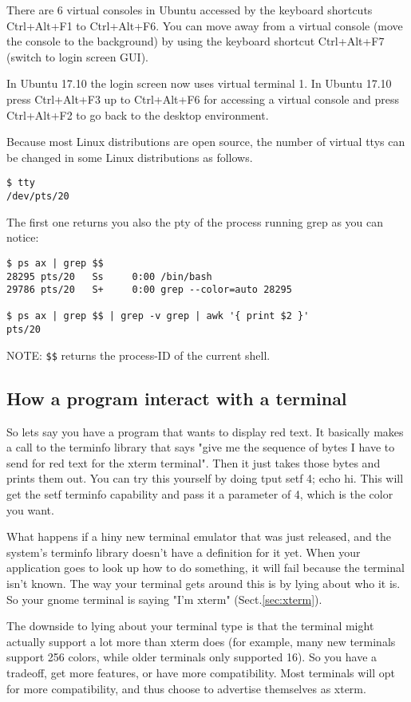 There are 6 virtual consoles in Ubuntu accessed by the keyboard shortcuts
Ctrl+Alt+F1 to Ctrl+Alt+F6. You can move away from a virtual console (move the
console to the background) by using the keyboard shortcut Ctrl+Alt+F7 (switch
to login screen GUI).

In Ubuntu 17.10 the login screen now uses virtual terminal 1. In Ubuntu 17.10
press Ctrl+Alt+F3 up to Ctrl+Alt+F6 for accessing a virtual console and press
Ctrl+Alt+F2 to go back to the desktop environment.  

Because most Linux distributions are open source, the number of virtual ttys can
be changed in some Linux distributions as follows. 

\begin{verbatim}
$ tty 
/dev/pts/20
\end{verbatim}

The first one returns you also the pty of the process running grep as you can
notice:
\begin{verbatim}
$ ps ax | grep $$
28295 pts/20   Ss     0:00 /bin/bash
29786 pts/20   S+     0:00 grep --color=auto 28295

$ ps ax | grep $$ | grep -v grep | awk '{ print $2 }'
pts/20
\end{verbatim}
NOTE: \verb!$$! returns the process-ID of the current shell.

\subsection{How a program interact with a terminal}

So lets say you have a program that wants to display red text. It basically
makes a call to the terminfo library that says "give me the sequence of bytes I
have to send for red text for the xterm terminal". Then it just takes those
bytes and prints them out.
You can try this yourself by doing tput setf 4; echo hi. This will get the setf
terminfo capability and pass it a parameter of 4, which is the color you want.

What happens if a hiny new terminal emulator that was just released, and the
system's terminfo library doesn't have a definition for it yet. When your
application goes to look up how to do something, it will fail because the
terminal isn't known. The way your terminal gets around this is by lying about
who it is. So your gnome terminal is saying "I'm xterm" (Sect.\ref{sec:xterm}).

The downside to lying about your terminal type is that the terminal might
actually support a lot more than xterm does (for example, many new terminals
support 256 colors, while older terminals only supported 16). So you have a
tradeoff, get more features, or have more compatibility. Most terminals will opt
for more compatibility, and thus choose to advertise themselves as xterm.

